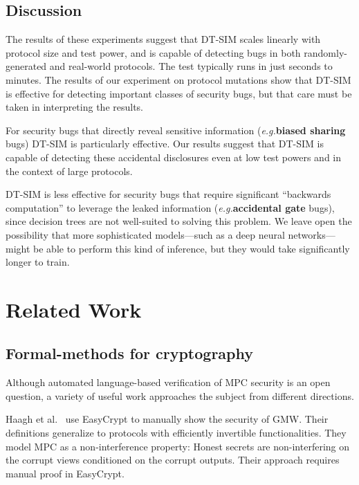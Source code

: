 \documentclass[acmlarge, manuscript, screen, review, anonymous, table]{acmart}
\newcommand{\eg}{\textit{e.g.}\xspace}
\newcommand{\toolname}{\textsc{DT-SIM}\xspace}
\begin{document}
\subsection{Discussion}

The results of these experiments suggest that \toolname scales linearly with protocol size and test power,
and is capable of detecting bugs in both randomly-generated and real-world protocols.
The test typically runs in just seconds to minutes.
The results of our experiment on protocol mutations show that \toolname is effective for detecting important classes of security bugs,
but that care must be taken in interpreting the results.

For security bugs that directly reveal sensitive information (\eg \textbf{biased sharing} bugs) \toolname is particularly effective.
Our results suggest that \toolname is capable of detecting these accidental disclosures even at low test powers and in the context of large protocols.

\toolname is less effective for security bugs that require significant ``backwards computation'' to leverage the leaked information
(\eg \textbf{accidental gate} bugs), since decision trees are not well-suited to solving this problem.
We leave open the possibility that more sophisticated models---such as a deep neural networks---might
be able to perform this kind of inference, but they would take significantly longer to train.



\section{Related Work}

\subsection{Formal-methods for cryptography}
Although automated language-based verification of MPC security is an open question,
a variety of useful work approaches the subject from different directions.

Haagh et al.~\cite{haagh2018computer} %
use EasyCrypt to manually show the security of GMW.
Their definitions generalize to protocols with efficiently invertible functionalities.
They model MPC as a non-interference property: Honest secrets are non-interfering on the corrupt views conditioned on the corrupt outputs.
Their approach requires manual proof in EasyCrypt.
\end{document}

